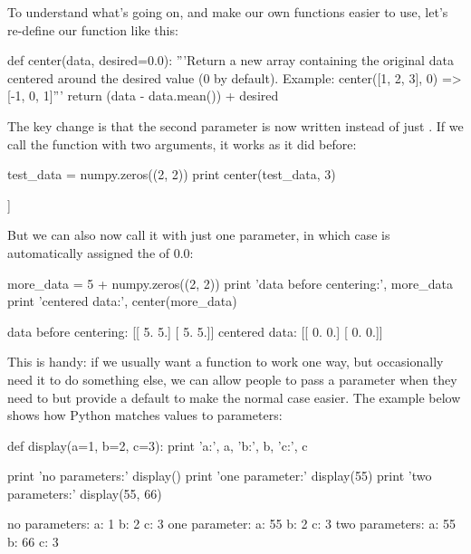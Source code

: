To understand what's going on, and make our own functions easier to use,
let's re-define our  function like this:

\begin{VerbIn}
def center(data, desired=0.0):
    '''Return a new array containing the original data centered around the desired value (0 by default).
    Example: center([1, 2, 3], 0) => [-1, 0, 1]'''
    return (data - data.mean()) + desired
\end{VerbIn}

The key change is that the second parameter is now written
 instead of just . If we call the
function with two arguments, it works as it did before:

\begin{VerbIn}
test_data = numpy.zeros((2, 2))
print center(test_data, 3)
\end{VerbIn}

\begin{VerbOut}
[[ 3.  3.]
 [ 3.  3.]]
\end{VerbOut}

But we can also now call it with just one parameter, in which case
 is automatically assigned the
 of 0.0:

\begin{VerbIn}
more_data = 5 + numpy.zeros((2, 2))
print 'data before centering:', more_data
print 'centered data:', center(more_data)
\end{VerbIn}

\begin{VerbOut}
data before centering: [[ 5.  5.]
 [ 5.  5.]]
centered data: [[ 0.  0.]
 [ 0.  0.]]
\end{VerbOut}

This is handy: if we usually want a function to work one way, but
occasionally need it to do something else, we can allow people to pass a
parameter when they need to but provide a default to make the normal
case easier. The example below shows how Python matches values to
parameters:

\begin{VerbIn}
def display(a=1, b=2, c=3):
    print 'a:', a, 'b:', b, 'c:', c

print 'no parameters:'
display()
print 'one parameter:'
display(55)
print 'two parameters:'
display(55, 66)
\end{VerbIn}

\begin{VerbOut}
no parameters:
a: 1 b: 2 c: 3
one parameter:
a: 55 b: 2 c: 3
two parameters:
a: 55 b: 66 c: 3
\end{VerbOut}

